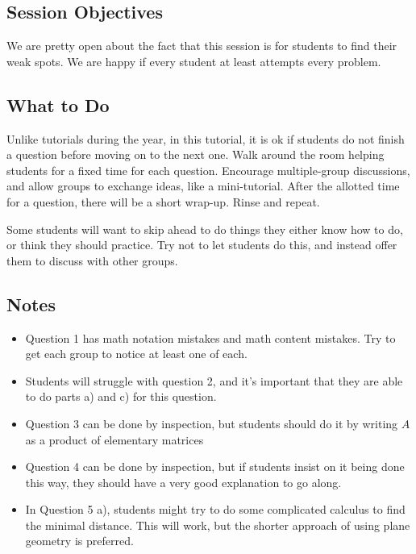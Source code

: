 \documentclass[red]{tutorial}
\theoremstyle{definition}
\theoremstyle{theorem}
\begin{document}
\begin{instructions}
  \subsection*{Session Objectives}
  We are pretty open about the fact that this session is 
  for students to find their weak spots. We are happy if 
  every student at least attempts every problem.

  \subsection*{What to Do}
  Unlike tutorials during the year, in this tutorial, it is 
  ok if students do not finish a question before moving on to 
  the next one. Walk around the room helping students for a 
  fixed time for each question. Encourage multiple-group 
  discussions, and allow groups to exchange ideas, like a 
  mini-tutorial. After the allotted time for a question, 
  there will be a short wrap-up. Rinse and repeat.

  Some students will want to skip ahead to do things they 
  either know how to do, or think they should practice. Try not 
  to let students do this, and instead offer them to discuss 
  with other groups.
  \subsection*{Notes}
  \begin{itemize}
    \item Question 1 has math notation mistakes and math content 
      mistakes. Try to get each group to notice at least one of each.
    \item Students will struggle with question 2, and it's 
      important that they are able to do parts a) and c) for this 
      question.
    \item Question 3 can be done by inspection, but students should 
      do it by writing $A$ as a product of elementary matrices
    \item Question 4 can be done by inspection, but if students 
      insist on it being done this way, they should have a very 
      good explanation to go along.
    \item In Question 5 a), students might try to do some complicated 
      calculus to find the minimal distance. This will work, but the 
      shorter approach of using plane geometry is preferred.
  \end{itemize}
\end{instructions}
\end{document}
